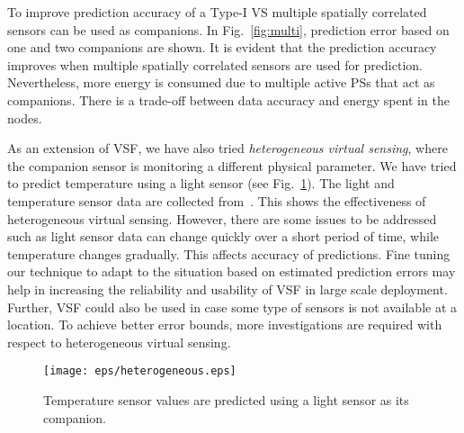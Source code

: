 \documentclass[a4paper,conference]{IEEEtran}
\begin{document}
To improve prediction accuracy of a Type-I VS multiple spatially correlated sensors can be used as companions. In Fig.~\ref{fig:multi}, prediction error based on one and two companions are shown. It is evident that the prediction accuracy improves when multiple spatially correlated sensors are used for prediction. Nevertheless, more energy is consumed due to multiple active PSs that act as companions. There is a trade-off between data accuracy and energy spent in the nodes.

As an extension of VSF, we have also tried \textit{heterogeneous virtual sensing}, where the companion sensor is monitoring a different physical parameter. We have tried to predict temperature using a light sensor (see Fig.~\ref{fig:heterogeneous}). The light and temperature sensor data are collected from~\cite{nrel}. This shows the effectiveness of heterogeneous virtual sensing. However, there are some issues to be addressed such as light sensor data can change quickly over a short period of time, while temperature changes gradually. This affects accuracy of predictions. Fine tuning our technique to adapt to the situation based on estimated prediction errors may help in increasing the reliability and usability of VSF in large scale deployment. Further, VSF could also be used in case some type of sensors is not available at a location. To achieve better error bounds, more investigations are required with respect to heterogeneous virtual sensing. 
\begin{figure}[]
\centering
\texttt{[image: eps/heterogeneous.eps]}
\caption{Temperature sensor values are predicted using a light sensor as its companion.}
\label{fig:heterogeneous}
\end{figure}
\end{document}
